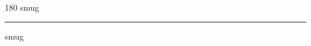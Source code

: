 
\begin{frame}
\begin{center}
\begin{turn}{180}
{\fontsize{2.5cm}{1em}\selectfont smug}
\end{turn}
\vspace{1em}\par  
\hrule
\vspace{1em}\par  
{\fontsize{2.5cm}{1em}\selectfont smug}
\end{center}
\end{frame}
